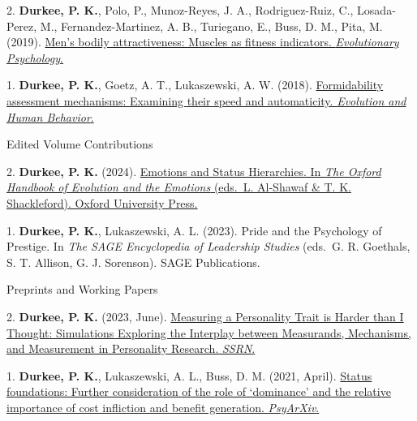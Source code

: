\documentclass[10pt,]{article}
\begin{document}
2.\hangindent=0.5in \marginpar{\scriptsize{\faBarChart\faPencil}}
\marginpar{\textsuperscript{}} \textbf{Durkee, P. K.}, Polo, P.,
Munoz-Reyes, J. A., Rodriguez-Ruiz, C., Losada-Perez, M.,
Fernandez-Martinez, A. B., Turiegano, E., Buss, D. M., Pita, M. (2019).
\href{https://journals.sagepub.com/doi/pdf/10.1177/1474704919852918}{Men's
bodily attractiveness: Muscles as fitness indicators. \emph{Evolutionary
Psychology}.}

1.\hangindent=0.5in
\marginpar{\scriptsize{\faLightbulbO\faTable\faBarChart\faPencil}}
\marginpar{\textsuperscript{\faDatabase}} \textbf{Durkee, P.
K.}\textsuperscript{\faUnsorted}, Goetz, A.
T.\textsuperscript{\faUnsorted}, Lukaszewski, A. W. (2018).
\href{http://www.pdurkee.com/files/pubs/DurkeeGoetzLukaszewski_2018.pdf}{Formidability
assessment mechanisms: Examining their speed and automaticity.
\emph{Evolution and Human Behavior}.}

\textcolor{light-gray}{Edited Volume Contributions}

2.\hangindent=0.5in \marginpar{\scriptsize{\faLightbulbO\faPencil}}
\marginpar{\textsuperscript{}} \textbf{Durkee, P. K.} (2024).
\href{https://osf.io/hukwr}{Emotions and Status Hierarchies. In
\emph{The Oxford Handbook of Evolution and the Emotions} (eds.~L.
Al-Shawaf \& T. K. Shackleford). Oxford University Press.}

1.\hangindent=0.5in \marginpar{\scriptsize{\faLightbulbO\faPencil}}
\marginpar{\textsuperscript{}} \textbf{Durkee, P. K.}, Lukaszewski, A.
L. (2023). Pride and the Psychology of Prestige. In \emph{The SAGE
Encyclopedia of Leadership Studies} (eds.~G. R. Goethals, S. T. Allison,
G. J. Sorenson). SAGE Publications.

\textcolor{light-gray}{Preprints and Working Papers}

2.\hangindent=0.5in
\marginpar{\scriptsize{\faLightbulbO\faBarChart\faPencil}}
\marginpar{\textsuperscript{\faFileCodeO}} \textbf{Durkee, P. K.} (2023,
June). \href{http://dx.doi.org/10.2139/ssrn.4482488}{Measuring a
Personality Trait is Harder than I Thought: Simulations Exploring the
Interplay between Measurands, Mechanisms, and Measurement in Personality
Research. \emph{SSRN}.}

1.\hangindent=0.5in
\marginpar{\scriptsize{\faLightbulbO\faBarChart\faPencil}}
\marginpar{\textsuperscript{\faFileCodeO}} \textbf{Durkee, P. K.},
Lukaszewski, A. L., Buss, D. M. (2021, April).
\href{https://psyarxiv.com/4gvt5/}{Status foundations: Further
consideration of the role of `dominance' and the relative importance of
cost infliction and benefit generation. \emph{PsyArXiv}.}
\end{document}
